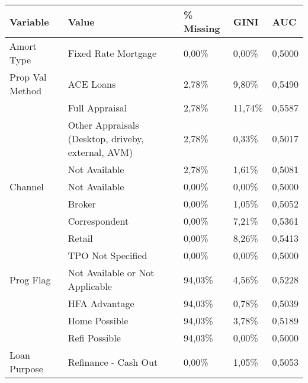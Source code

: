 \newpage
\begin{longtable}{ l p{5.5cm} l l l }\toprule      
\textbf{Variable}           & \textbf{Value}                                     & \textbf{\% Missing} & \textbf{GINI}    & \textbf{AUC}    \\\midrule
Amort Type                  & Fixed Rate Mortgage                                & 0,00\%     & 0,00\%  & 0,5000 \\\hline
Prop Val Method             & ACE Loans                                          & 2,78\%     & 9,80\%  & 0,5490 \\
                            & Full Appraisal                                     & 2,78\%     & 11,74\% & 0,5587 \\
                            & Other Appraisals (Desktop, driveby, external, AVM) & 2,78\%     & 0,33\%  & 0,5017 \\
                            & Not Available                                      & 2,78\%     & 1,61\%  & 0,5081 \\\hline
Channel                     & Not Available                                      & 0,00\%     & 0,00\%  & 0,5000 \\
                            & Broker                                             & 0,00\%     & 1,05\%  & 0,5052 \\
                            & Correspondent                                      & 0,00\%     & 7,21\%  & 0,5361 \\
                            & Retail                                             & 0,00\%     & 8,26\%  & 0,5413 \\
                            & TPO Not Specified                                  & 0,00\%     & 0,00\%  & 0,5000 \\\hline
Prog Flag                   & Not Available or Not Applicable                    & 94,03\%    & 4,56\%  & 0,5228 \\
                            & HFA Advantage                                      & 94,03\%    & 0,78\%  & 0,5039 \\
                            & Home Possible                                      & 94,03\%    & 3,78\%  & 0,5189 \\
                            & Refi Possible                                      & 94,03\%    & 0,00\%  & 0,5000 \\\hline
Loan Purpose                & Refinance - Cash Out                               & 0,00\%     & 1,05\%  & 0,5053 \\

\end{longtable}
